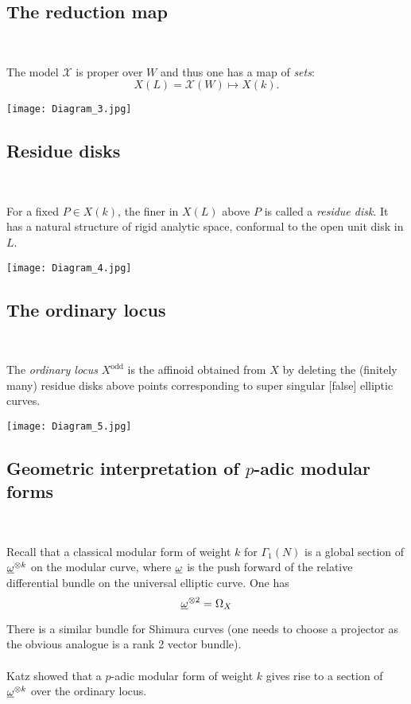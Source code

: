 \documentclass[12pt,amsfont]{amsart}
\begin{document}
\subsection{The reduction map}
{\ }

The model $\mathcal{X}$ is proper over $W$ and thus one has a map of \emph{sets}:
\[X(L) = \mathcal{X}(W) \mapsto X(k).\]

{\begin{center}  \texttt{[image: Diagram\_3.jpg]}
\end{center}}

\subsection{Residue disks}
{\ }

For a fixed $P \in X(k)$, the finer in $X(L)$ above $P$ is called a \emph{residue disk}. It has a natural structure of rigid analytic space, conformal to the open unit disk in $L$.

{\begin{center}  \texttt{[image: Diagram\_4.jpg]}
\end{center}}

\subsection{The ordinary locus}
{\ }

The \emph{ordinary locus} $X^{\text{odd}}$ is the affinoid obtained from $X$ by deleting the (finitely many) residue disks above points corresponding to super singular [false] elliptic curves. 

{\begin{center}  \texttt{[image: Diagram\_5.jpg]}
\end{center}}

\subsection{Geometric interpretation of $p$-adic modular forms}
{\ }

Recall that a classical modular form of weight $k$ for $\Gamma_1(N)$ is a global section of $\underline{\omega}^{\otimes k}$ on the modular curve, where $\underline{\omega}$ is the push forward of the relative differential bundle on the universal elliptic curve. One has
\[\underline{\omega}^{\otimes 2} = \Omega_X\]

There is a similar bundle for Shimura curves (one needs to choose a projector as the obvious analogue is a rank 2 vector bundle). \\ \\
Katz showed that a $p$-adic modular form of weight $k$ gives rise to a section of $\underline{\omega}^{\otimes k}$ over the ordinary locus. 
\end{document}
